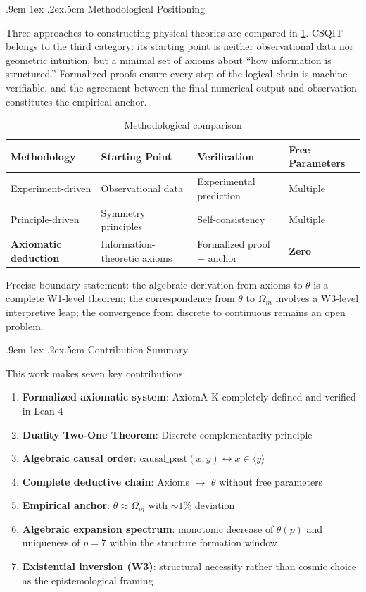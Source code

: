\documentclass[aps,prd,twocolumn,nofootinbib,floatfix]{revtex4-2}
\makeatletter
\def\subsection{%
  \@startsection{subsection}{2}{\z@}
    {.9cm \@plus1ex \@minus .2ex}{.5cm}
    {\normalfont\normalsize\bfseries\centering}%
}
\makeatother
\begin{document}
\subsection{Methodological Positioning}

Three approaches to constructing physical theories are compared in \cref{tab:methodology}. CSQIT belongs to the third category: its starting point is neither observational data nor geometric intuition, but a minimal set of axioms about ``how information is structured.'' Formalized proofs ensure every step of the logical chain is machine-verifiable, and the agreement between the final numerical output and observation constitutes the empirical anchor.

\begin{table}[!t]
\centering
\begin{tabular}{llll}
\hline
Methodology & Starting Point & Verification & Free Parameters \\
\hline
Experiment-driven & Observational data & Experimental prediction & Multiple \\
Principle-driven & Symmetry principles & Self-consistency & Multiple \\
\textbf{Axiomatic deduction} & Information-theoretic axioms & Formalized proof + anchor & \textbf{Zero} \\
\hline
\end{tabular}
\caption{Methodological comparison}
\label{tab:methodology}
\end{table}

Precise boundary statement: the algebraic derivation from axioms to $\theta$ is a complete W1-level theorem; the correspondence from $\theta$ to $\Omega_m$ involves a W3-level interpretive leap; the convergence from discrete to continuous remains an open problem.

\subsection{Contribution Summary}

This work makes seven key contributions:

\begin{enumerate}
    \item \textbf{Formalized axiomatic system}: AxiomA-K completely defined and verified in Lean 4
    \item \textbf{Duality Two-One Theorem}: Discrete complementarity principle
    \item \textbf{Algebraic causal order}: $\text{causal\_past}(x,y) \leftrightarrow x \in \langle y \rangle$
    \item \textbf{Complete deductive chain}: Axioms $\rightarrow$ $\theta$ without free parameters
    \item \textbf{Empirical anchor}: $\theta \approx \Omega_m$ with $\sim 1\%$ deviation
    \item \textbf{Algebraic expansion spectrum}: monotonic decrease of $\theta(p)$ and uniqueness of $p=7$ within the structure formation window
    \item \textbf{Existential inversion (W3)}: structural necessity rather than cosmic choice as the epistemological framing
\end{enumerate}
\end{document}
